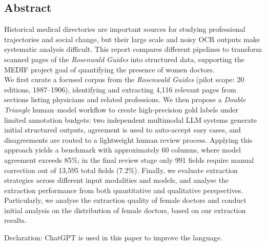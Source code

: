 \documentclass[11pt,titlepage]{report}
\begin{document}
\thispagestyle{numberonly}
\begin{summary}
\section*{Abstract}
Historical medical directories are important sources for studying professional trajectories and social change, but their large scale and noisy OCR outputs make systematic analysis difficult. This report compares different pipelines to transform scanned pages of the \textit{Rosenwald Guides} into structured data, supporting the MEDIF project goal of quantifying the presence of women doctors.
\\

We first curate a focused corpus from the \textit{Rosenwald Guides} (pilot scope: 20 editions, 1887--1906), identifying and extracting 4{,}116 relevant pages from sections listing physicians and related professions. We then propose a \textit{Double Triangle} human--model workflow to create high-precision gold labels under limited annotation budgets: two independent multimodal LLM systems generate initial structured outputs, agreement is used to auto-accept easy cases, and disagreements are routed to a lightweight human review process. Applying this approach yields a benchmark with approximately 60 columns, where model agreement exceeds 85\%; in the final review stage only 991 fields require manual correction out of 13{,}595 total fields (7.2\%). Finally, we evaluate extraction strategies across different input modalities and models, and analyse the extraction performance from both quantitative and qualitative perspectives. Particularly, we analyse the extraction quality of female doctors and conduct initial analysis on the distribution of female doctors, based on our extraction results.

\end{summary}

\begin{invsummary}

Declaration: ChatGPT is used in this paper to improve the language.

\end{invsummary}




















\clearpage
\pagestyle{numberonly}
\printbibliography
\end{document}
